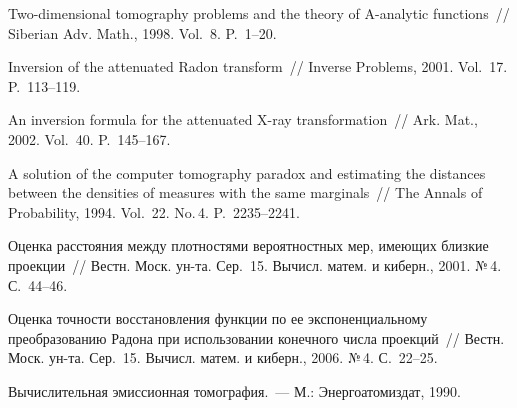 \begin{multicols}{2}
{\small\frenchspacing
{%
\begin{thebibliography}{9}    
Two-dimensional tomogra\-phy problems and the theory of A-analytic
functions~// Siberian Adv. Math., 1998. Vol.~8. P.~1--20.

Inversion of the attenuated Radon transform~// Inverse Problems, 2001. Vol.~17. P.~113--119.

An inversion formula for the attenuated X-ray transformation~// Ark. Mat., 2002. Vol.~40. P.~145--167.

A solution of the computer tomography paradox and estimating the distances between the densities of measures with the same marginals~// 
The Annals of Probability, 1994. Vol.~22. No.\,4. P.~2235--2241.

Оценка расстояния между плотностями вероятностных мер, имеющих близкие проекции~// Вестн. Моск. ун-та.
Сер.~15. Вычисл. матем. и киберн., 2001. №\,4. С.~44--46.

Оценка точности восстановления функции по ее экспоненциальному преобразованию Радона при использовании
конечного числа проекций~// Вестн. Моск. ун-та. Сер.~15. Вычисл. матем. и киберн., 2006. №\,4. С.~22--25.

\label{end\stat}

Вычислительная эмиссионная томография.~--- М.: Энергоатомиздат, 1990.
\end{thebibliography}
}
}
\end{multicols}
  